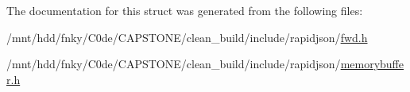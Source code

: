 The documentation for this struct was generated from the following files\+:\begin{DoxyCompactItemize}
\item 
/mnt/hdd/fnky/\+C0de/\+C\+A\+P\+S\+T\+O\+N\+E/clean\+\_\+build/include/rapidjson/\hyperlink{fwd_8h}{fwd.\+h}\item 
/mnt/hdd/fnky/\+C0de/\+C\+A\+P\+S\+T\+O\+N\+E/clean\+\_\+build/include/rapidjson/\hyperlink{memorybuffer_8h}{memorybuffer.\+h}\end{DoxyCompactItemize}
